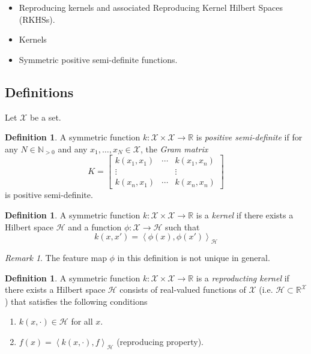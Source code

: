 \documentclass{amsart}
\theoremstyle{definition}
\newtheorem{definition}[theorem]{Definition}
\theoremstyle{remark}
\newtheorem{remark}[theorem]{Remark}
\numberwithin{equation}{section}
\begin{document}
\begin{itemize}
\item Reproducing kernels and associated Reproducing Kernel Hilbert Spaces (RKHSs).
\item Kernels
\item Symmetric positive semi-definite functions.
\end{itemize}

\subsection{Definitions}

Let $\mathcal{X}$ be a set.

\begin{definition}
A symmetric function $k: \mathcal{X} \times \mathcal{X}\to \mathbb{R}$ is \textit{positive semi-definite} if for any $N\in \mathbb{N}_{>0}$ and any $x_1, \ldots, x_N\in \mathcal{X}$, the \textit{Gram matrix}
\begin{equation}
K=
\begin{bmatrix}
k(x_1, x_1) & \cdots & k(x_1, x_n)\\
\vdots & & \vdots\\
k(x_n, x_1) & \cdots & k(x_n, x_n)
\end{bmatrix}
\end{equation}
is positive semi-definite.
\end{definition}

\begin{definition}
A symmetric function $k: \mathcal{X}\times \mathcal{X}\to \mathbb{R}$ is a \textit{kernel} if there exists a Hilbert space $\mathcal{H}$ and a function $\phi: \mathcal{X}\to \mathcal{H}$ such that
\begin{equation}
k(x, x') = \left< \phi(x), \phi(x')\right>_\mathcal{H}
\end{equation}
\end{definition}
\begin{remark}
The feature map $\phi$ in this definition is not unique in general.
\end{remark}

\begin{definition}
A symmetric function $k: \mathcal{X}\times \mathcal{X}\to \mathbb{R}$ is a \textit{reproducting kernel} if there exists a Hilbert space $\mathcal{H}$ consists of real-valued functions of $\mathcal{X}$ (i.e. $\mathcal{H}\subset \mathbb{R}^\mathcal{X}$) that satisfies the following conditions
\begin{enumerate}
\item $k(x, \cdot)\in \mathcal{H}$ for all $x$.
\item $f(x) = \left< k(x, \cdot), f\right>_\mathcal{H}$ (reproducing property).
\end{enumerate}
\end{definition}
\end{document}
